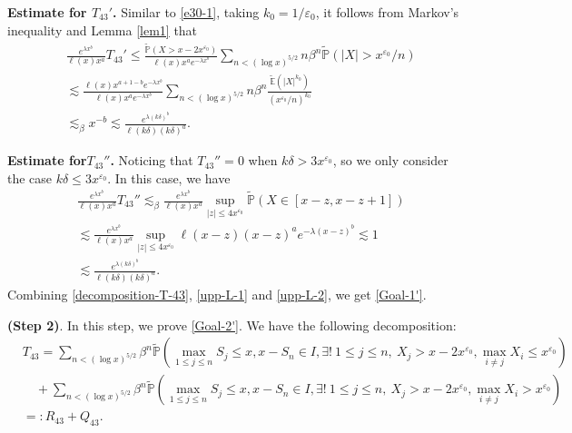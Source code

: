 \documentclass[11pt]{article}
\numberwithin{equation}{section}
\begin{document}
\noindent
{\bf Estimate for $T_{43}'$.} Similar to \eqref{e30-1},  taking $k_0=1/\varepsilon_0$, it follows from   Markov's inequality and Lemma \ref{lem1} that 
\begin{align}\label{upp-L-1}
	&\frac{ e^{\lambda x^b}}{\ell(x)x^a} T_{43}' \leq \frac{\widetilde{\mathbb{P}}\left(  X > x-2x^{\varepsilon_0}\right) }{\ell(x)x^a e^{-\lambda x^b}} \sum_{n< (\log x)^{5/2}}  n\beta^{n}  \widetilde{\mathbb{P}}\left( |X|>x^{\varepsilon_0}/n\right) \nonumber\\
	&\lesssim \frac{\ell(x)x^{a+1-b}e^{-\lambda x^b}}{\ell(x)x^a e^{-\lambda x^b}} \sum_{n< (\log x)^{5/2}}  n\beta^{n}  \frac{\widetilde{\mathbb{E}}\left(|X|^{k_0} \right) }{(x^{\varepsilon_0}/n)^{k_0} }  \nonumber\\
	&\lesssim_\beta  x^{-b} \lesssim \frac{e^{\lambda (k\delta)^b}}{\ell(k\delta)(k\delta)^a }.
\end{align}

\noindent
{\bf Estimate for$T_{43}''$.} Noticing that $T_{43}''=0$ when $k\delta>3x^{\varepsilon_0}$, so we only consider the case $k\delta \leq 3x^{\varepsilon_0}$.  In this case, we have
\begin{align}\label{upp-L-2}
	&\frac{ e^{\lambda x^b}}{\ell(x)x^a} T_{43}''  \lesssim_\beta  \frac{ e^{\lambda x^b}}{\ell(x)x^a}    \sup_{|z|\leq 4x^{\varepsilon_0}} \widetilde{\mathbb{P}}\left( X\in[x-z, x-z+1]\right) \nonumber\\
	&\lesssim \frac{ e^{\lambda x^b}}{\ell(x)x^a}   \sup_{|z|\leq 4x^{\varepsilon_0}} \ell(x-z) (x-z)^a e^{-\lambda (x-z)^b}\lesssim 1\nonumber\\
	& \lesssim \frac{e^{\lambda (k\delta)^b}}{\ell(k\delta)(k\delta)^a }.
\end{align}
Combining \eqref{decomposition-T-43}, \eqref{upp-L-1} and \eqref{upp-L-2}, we get \eqref{Goal-1'}.

\noindent
{\bf(Step 2)}. In this step, we prove  \eqref{Goal-2'}.   We have the following decomposition: 
\begin{align}\label{decomposition-T-43-QR}
	&T_{43} = \sum_{n< (\log x)^{5/2}}  \beta^{n}  \widetilde{\mathbb{P}}\left(\max_{1\leq j \leq n} S_j \leq x, x-S_n\in I,  \exists !\ 1\leq j\leq n,\  X_j > x-2x^{\varepsilon_0}, \max_{i\neq j} X_i \leq x^{\varepsilon_0}\right) \nonumber\\
	&\quad + \sum_{n< (\log x)^{5/2}}  \beta^{n}  \widetilde{\mathbb{P}}\left(\max_{1\leq j \leq n} S_j \leq x, x-S_n\in I,  \exists !\ 1\leq j\leq n,\  X_j > x-2x^{\varepsilon_0}, \max_{i\neq j} X_i > x^{\varepsilon_0}\right) \nonumber\\
	&=: R_{43}+Q_{43}. 
\end{align}
\end{document}
